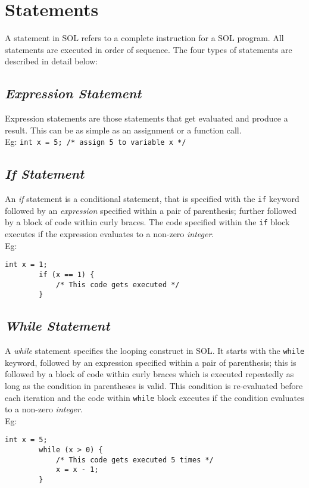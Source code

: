 \documentclass[letterpaper,12pt]{article}
\begin{document}
\section{Statements} \label{classes}
A statement in SOL refers to a complete instruction for a SOL program. All statements are executed in order of sequence. The four types of statements are described in detail below:\\

\subsection{\textit{Expression Statement}}
Expression statements are those statements that get evaluated and produce a result. This can be as simple as an assignment or a function call.\\
Eg: \texttt{int x = 5; /* assign 5 to variable x */}

\subsection{\textit{If Statement}}
An \textit{if} statement is a conditional statement, that is specified with the \texttt{if} keyword followed by an \textit{expression} specified within a pair of parenthesis; further followed by a block of code within curly braces. The code specified within the \texttt{if} block executes if the expression evaluates to a non-zero \textit{integer}.\\
Eg: \begin{lstlisting}[aboveskip=-13pt]
        int x = 1;
        if (x == 1) {
            /* This code gets executed */
        }
    \end{lstlisting}

\subsection{\textit{While Statement}}
A \textit{while} statement specifies the looping construct in SOL. It starts with the \texttt{while} keyword, followed by an expression specified within a pair of parenthesis; this is followed by a block of code within curly braces which is executed repeatedly as long as the condition in parentheses is valid. This condition is re-evaluated before each iteration and the code within \texttt{while} block executes if the condition evaluates to a non-zero \textit{integer}. \\
Eg: \begin{lstlisting}[aboveskip=-13pt]
        int x = 5;
        while (x > 0) {
            /* This code gets executed 5 times */
            x = x - 1;
        }
    \end{lstlisting}
\end{document}
